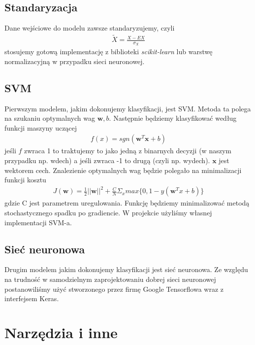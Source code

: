 \documentclass[polish]{article}
\begin{document}
\subsection{Standaryzacja}
Dane wejściowe do modelu zawsze standaryzujemy, czyli
\begin{gather*}
	\tilde X = \frac{X - EX}{\sigma_X}
\end{gather*}
stosujemy gotową implementację z biblioteki \textit{scikit-learn} lub warstwę normalizacyjną w przypadku sieci neuronowej.
\subsection{SVM}
Pierwszym modelem, jakim dokonujemy klasyfikacji, jest SVM. Metoda ta polega na szukaniu optymalnych wag $\boldsymbol{w}, b$.
Następnie będziemy klasyfikować według funkcji maszyny uczącej 
\begin{gather*}
	f(x) = sgn(\boldsymbol{w}^T \boldsymbol{x} + b)
\end{gather*}
jeśli $f$ zwraca 1 to traktujemy to jako jedną z binarnych decyzji (w naszym przypadku np. wdech) a jeśli zwraca -1 to drugą (czyli np. wydech).
$\textbf{x}$ jest wektorem cech.  Znalezienie optymalnych wag będzie polegało na minimalizacji
funkcji kosztu
\begin{gather*}
	J(\boldsymbol{w}) = \frac{1}{2}||\boldsymbol{w}||^2 + \frac{C}{N}\Sigma_x max\{0, 1 - y(\boldsymbol{w}^Tx + b)\}
\end{gather*}
gdzie C jest parametrem uregulowania. Funkcję będziemy minimalizować metodą stochastycznego spadku po gradiencie.
W projekcie użyliśmy własnej implementacji SVM-a.
\subsection{Sieć neuronowa}
Drugim modelem jakim dokonujemy klasyfikacji jest sieć neuronowa. Ze względu na trudność w samodzielnym zaprojektowaniu dobrej sieci neuronowej postanowiliśmy użyć stworzonego przez firmę Google Tensorflowa wraz z interfejsem Keras. 
\section{Narzędzia i inne}
\end{document}
